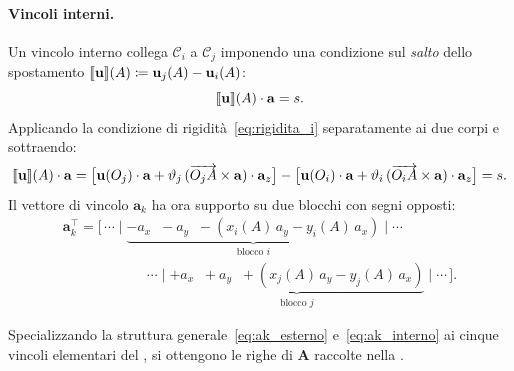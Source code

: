 \paragraph{Vincoli interni.}
Un vincolo interno collega $\mathcal{C}_i$ a $\mathcal{C}_j$
imponendo una condizione sul \emph{salto} dello spostamento
$\llbracket\mathbf{u}\rrbracket(A) \coloneqq \mathbf{u}_j(A) - \mathbf{u}_i(A)$:
\begin{equation}\label{eq:vincolo_int_vett}
	\llbracket\mathbf{u}\rrbracket(A) \cdot \mathbf{a} = s.
\end{equation}
Applicando la condizione di rigidità~\eqref{eq:rigidita_i}
separatamente ai due corpi e sottraendo:
\begin{equation}\label{eq:vincolo_int_scal}
	\llbracket\mathbf{u}\rrbracket(A)\cdot\mathbf{a}
	= \bigl[\mathbf{u}(O_j)\cdot\mathbf{a}
	+ \vartheta_j\,(\overrightarrow{O_j A}\times\mathbf{a})
	\cdot\mathbf{a}_z\bigr]
	- \bigl[\mathbf{u}(O_i)\cdot\mathbf{a}
	+ \vartheta_i\,(\overrightarrow{O_i A}\times\mathbf{a})
	\cdot\mathbf{a}_z\bigr]
	= s.
\end{equation}
Il vettore di vincolo $\bm{a}_k$ ha ora supporto su due
blocchi con segni opposti:
\begin{multline}\label{eq:ak_interno}
	\bm{a}_k^{\top} =
	\bigl[\,\cdots\;\Big|\;
	\underbrace{-a_x \;\; -a_y \;\;
		-(x_i(A)\,a_y - y_i(A)\,a_x)
	}_{\text{blocco }i}
	\;\Big|\;\cdots \\[6pt]
	\hspace{6em}
	\cdots\;\Big|\;
	\underbrace{+a_x \;\; +a_y \;\;
		+(x_j(A)\,a_y - y_j(A)\,a_x)
	}_{\text{blocco }j}
	\;\Big|\;\cdots\,\bigr].
\end{multline}

\medskip
Specializzando la struttura
generale~\eqref{eq:ak_esterno}
e~\eqref{eq:ak_interno} ai cinque vincoli elementari
del , si ottengono le righe di
$\bm{A}$ raccolte nella .

